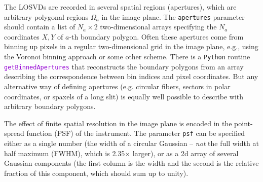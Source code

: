 \documentclass[12pt]{article}
\newcommand{\Python}{\texttt{Python}\xspace}
\newcommand{\ttt}[1]{\textcolor{darkviolet}{\texttt{#1}}}
\newcommand{\ppp}[1]{\textcolor{darkolive} {\texttt{#1}}}
\begin{document}
The LOSVDs are recorded in several spatial regions (apertures), which are arbitrary polygonal regions $\Omega_a$ in the image plane. The \ppp{apertures} parameter should contain a list of $N_a\times2$ two-dimensional arrays specifying the $N_a$ coordinates $X,Y$ of $a$-th boundary polygon. Often these apertures come from binning up pixels in a regular two-dimensional grid in the image plane, e.g., using the Voronoi binning approach \cite{CappellariCopin2003} or some other scheme. There is a \Python routine \ttt{getBinnedApertures} that reconstructs the boundary polygons from an array describing the correspondence between bin indices and pixel coordinates. But any alternative way of defining apertures (e.g. circular fibers, sectors in polar coordinates, or spaxels of a long slit) is equally well possible to describe with arbitrary boundary polygons.

The effect of finite spatial resolution in the image plane is encoded in the point-spread function (PSF) of the instrument. The parameter \ppp{psf} can be specified either as a single number (the width of a circular Gaussian -- \textit{not} the full width at half maximum (FWHM), which is 2.35$\times$ larger), or as a 2d array of several Gaussian components (the first column is the width and the second is the relative fraction of this component, which should sum up to unity).
\end{document}
